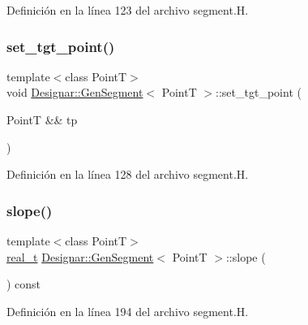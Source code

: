 Definición en la línea 123 del archivo segment.\+H.

\mbox{\label{class_designar_1_1_gen_segment_a218a089156740da0d16ec68b62f957d6}} 
\subsubsection{\texorpdfstring{set\+\_\+tgt\+\_\+point()}{set\_tgt\_point()}\hspace{0.1cm}{\footnotesize\ttfamily [2/2]}}
{\footnotesize\ttfamily template$<$class PointT$>$ \\
void \hyperlink{class_designar_1_1_gen_segment}{Designar\+::\+Gen\+Segment}$<$ PointT $>$\+::set\+\_\+tgt\+\_\+point (\begin{DoxyParamCaption}\item[{PointT \&\&}]{tp }\end{DoxyParamCaption})\hspace{0.3cm}{\ttfamily [inline]}}



Definición en la línea 128 del archivo segment.\+H.

\mbox{\label{class_designar_1_1_gen_segment_a02652b0274b3b597fb588d83d424b4bd}} 
\subsubsection{\texorpdfstring{slope()}{slope()}}
{\footnotesize\ttfamily template$<$class PointT$>$ \\
\hyperlink{namespace_designar_aca2c32af26808dbec1f3a3071fad25ce}{real\+\_\+t} \hyperlink{class_designar_1_1_gen_segment}{Designar\+::\+Gen\+Segment}$<$ PointT $>$\+::slope (\begin{DoxyParamCaption}{ }\end{DoxyParamCaption}) const\hspace{0.3cm}{\ttfamily [inline]}}



Definición en la línea 194 del archivo segment.\+H.


